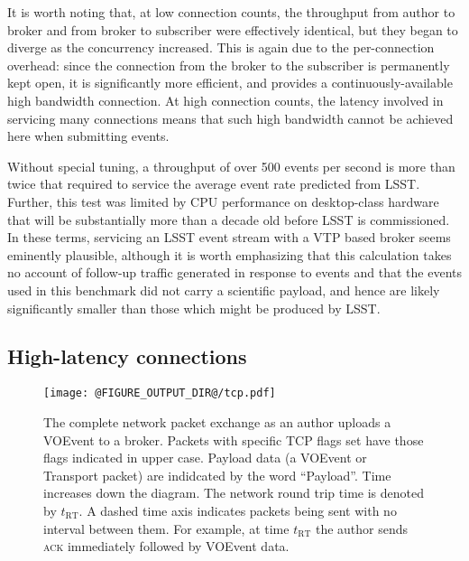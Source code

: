 \documentclass[5p,authoryear]{elsarticle}
\begin{document}
It is worth noting that, at low connection counts, the throughput from author
to broker and from broker to subscriber were effectively identical, but they
began to diverge as the concurrency increased. This is again due to the
per-connection overhead: since the connection from the broker to the
subscriber is permanently kept open, it is significantly more efficient, and
provides a continuously-available high bandwidth connection. At high
connection counts, the latency involved in servicing many connections means
that such high bandwidth cannot be achieved here when submitting events.

Without special tuning, a throughput of over 500 events per second is more
than twice that required to service the average event rate predicted from
LSST\@. Further, this test was limited by CPU performance on desktop-class
hardware that will be substantially more than a decade old before LSST is
commissioned. In these terms, servicing an LSST event stream with a VTP based
broker seems eminently plausible, although it is worth emphasizing that this
calculation takes no account of follow-up traffic generated in response to
events and that the events used in this benchmark did not carry a scientific
payload, and hence are likely significantly smaller than those which might be
produced by LSST.

\subsection{High-latency connections}
\label{sec:perf:highlatency}

\begin{figure}
  \begin{center}
  \texttt{[image: @FIGURE\_OUTPUT\_DIR@/tcp.pdf]}
  \end{center}

  \caption{The complete network packet exchange as an author uploads a VOEvent
  to a broker. Packets with specific TCP flags set have those flags indicated
  in upper case. Payload data (a VOEvent or Transport packet) are indidcated
  by the word ``Payload''. Time increases down the diagram. The network round
  trip time is denoted by $t_\mathrm{RT}$. A dashed time axis indicates
  packets being sent with no interval between them. For example, at time
  $t_\mathrm{RT}$ the author sends \textsc{ack} immediately followed by
  VOEvent data.}

  \label{fig:tcp}
\end{figure}
\end{document}
